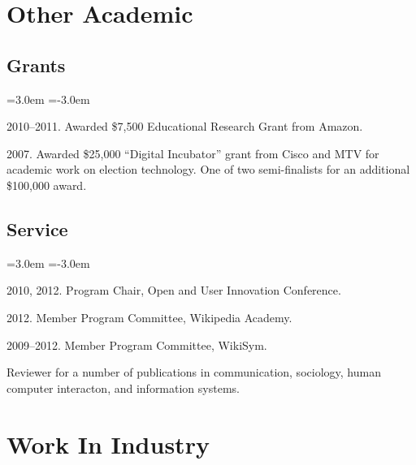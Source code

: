 \documentclass[10pt]{article}
\newenvironment{cvlist}{
\begin{list}{}{\leftmargin=3.0em \itemindent=-3.0em}
  \setlength{\itemsep}{0pt}
  \setlength{\parskip}{0em}
  \setlength{\parsep}{1em}
  \setlength{\parindent}{0em}}
{\vspace{1em}
\end{list}}
\begin{document}
\section{Other Academic}


\subsection{Grants}

\begin{cvlist}
\item 2010--2011. Awarded \$7,500 Educational Research Grant from Amazon.

\item 2007. Awarded \$25,000 ``Digital Incubator'' grant from Cisco and MTV for academic work on election technology. One of two semi-finalists for an additional \$100,000 award.
\end{cvlist}


\subsection{Service}

\begin{cvlist}
\item 2010, 2012. Program Chair, Open and User Innovation Conference.
\item 2012. Member Program Committee, Wikipedia Academy.
\item 2009--2012. Member Program Committee, WikiSym.
\item Reviewer for a number of publications in communication, sociology, human computer interacton, and information systems.
\end{cvlist}

\section{Work In Industry}
\end{document}
